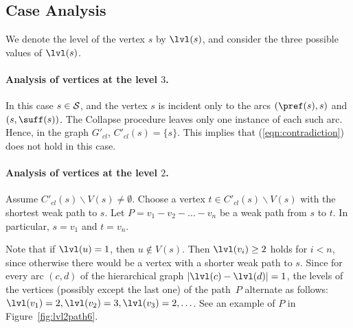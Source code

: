 \subsection{Case Analysis}
\label{sec:proof2}
We denote the level of the vertex $ s $ by $ \lvl (s) $, and consider the three possible values of $\lvl(s)$.


\paragraph{Analysis of vertices at the level \texorpdfstring{$3$}{3}.}

In this case $ s \in {\cal S} $, and the vertex $ s $ is incident only to the arcs $ (\pref (s), s)$ and $(s, \suff (s)) $. The Collapse procedure leaves only one instance of each such arc. Hence, in the graph $ G'_{cl} $, $ C'_{cl} (s) = \{s \} $. This implies that (\ref{eqn:contradiction}) does not hold in this case.

\paragraph{Analysis of vertices at the level \texorpdfstring{$2$}{2}.}

Assume $ C'_{cl} (s) \backslash V (s) \ne\emptyset$. Choose a vertex $ t\in C'_{cl} (s) \backslash V (s)$ with the shortest weak path to $s$. Let $P = v_1 - v_2 - \ldots - v_n $ be a weak path from $s$ to $t$. In particular, $s=v_1$ and $t=v_n$.

Note that if $ \lvl (u) = 1 $, then $ u \notin V (s) $. Then $ \lvl (v_i) \ge 2 $ holds for $ i<n $, since otherwise there would be a vertex with a shorter weak path to $s$. Since for every arc $(c,d)$ of the hierarchical graph $ | \lvl (c) - \lvl (d) | = 1 $,  the levels of the vertices (possibly except the last one) of the path~$P$ alternate as follows: $ \lvl (v_1) = 2, \lvl (v_2) = 3, \lvl (v_3) = 2,\ldots$. See an example of $P$ in Figure~\ref{fig:lvl2path6}.


